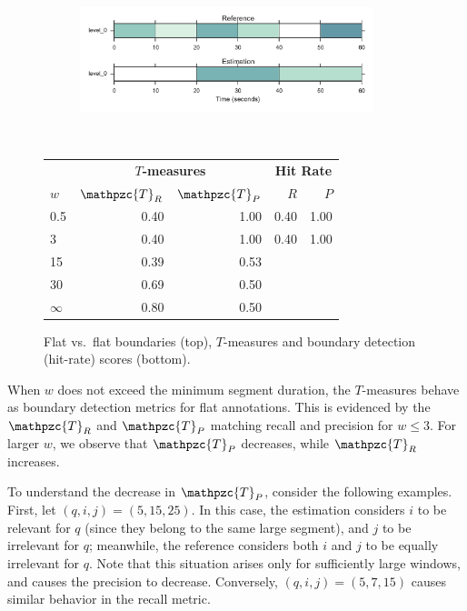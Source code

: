 \documentclass{article}
\def\shag{\ensuremath{\mathpzc{T}}}
\begin{document}
\begin{figure}
  \centering
  \begin{subfigure}{0.5\textwidth}
    \centering
    \includegraphics[width=0.94\textwidth]{figs/flat-flat.pdf}
  \end{subfigure}%
  \\
  \begin{minipage}{0.5\textwidth}
    \small
    \centering
    \vspace{10pt}
    \begin{tabular}{l|rr|rr}
      & \multicolumn{2}{c|}{\textbf{$T$-measures}} & \multicolumn{2}{c}{\textbf{Hit Rate}} \\
      $w$ & $\shag_R$   & $\shag_P$ &  $R$     & $P$ \\
      \hline
      0.5       & 0.40   & 1.00   & 0.40 & 1.00 \\
      3         & 0.40   & 1.00   & 0.40 & 1.00 \\
      15        & 0.39  & 0.53 \\
      30        & 0.69  & 0.50 \\
      $\infty$  & 0.80   & 0.50 
    \end{tabular}
  \end{minipage}
  \caption{Flat vs.\ flat boundaries (top), $T$-measures and boundary detection
    (hit-rate) scores (bottom).}
  \label{fig:flat-flat}
\end{figure}

When $w$ does not exceed the minimum segment duration, the $T$-measures behave
as boundary detection metrics for flat annotations.
This is evidenced by the $\shag_R$ and $\shag_P$ matching recall and precision for $w \leq 3$.
For larger $w$, we observe that $\shag_P$ decreases, while $\shag_R$ increases.

To understand the decrease in $\shag_P$, consider the following examples.
First, let $(q,i,j) = (5,15,25)$.
In this case, the estimation considers $i$ to be relevant for $q$ (since they belong to the same large segment), and $j$ to be irrelevant for $q$; meanwhile, the reference considers both $i$ and $j$ to be equally irrelevant for $q$.
Note that this situation arises only for sufficiently large
windows, and causes the precision to decrease.
Conversely, $(q,i,j) = (5, 7, 15)$ causes similar behavior in the recall metric.
\end{document}
